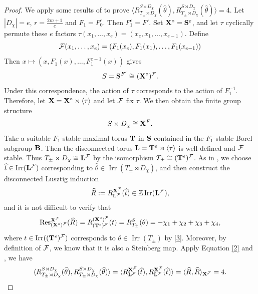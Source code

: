 \documentclass[11pt,a4paper]{article}
\numberwithin{equation}{section}
\theoremstyle{definition}
\theoremstyle{remark}
\newcommand{\Irr}{\operatorname{Irr}}
\begin{document}
\begin{proof}
We apply some results of \cite[Sections 2-3]{DM} to prove  $\langle R_{T_\pm\rtimes D_\chi}^{S\rtimes D_\chi}(\widehat \theta), R_{T_\pm\rtimes D_\chi}^{S\rtimes D_\chi}(\widehat \theta) \rangle=4$.
Let $|D_\chi|=e$, $r=\frac{2m+1}{e}$ and $F_1=F_0^r$.
Then $F_1^e=F'$. Set ${\bf X}^\circ={\bf S}^e$, and let $\tau$ cyclically permute these $e$ factors
$\tau(x_1,\dots,x_e)=(x_e,x_1,\dots,x_{e-1})$.
Define 
\[
{\cal F}(x_1,\dots,x_e)=(F_1(x_e),F_1(x_1),\dots,F_1(x_{e-1}))
\]
Then
$x\mapsto (x,F_1(x),\dots,F_1^{e-1}(x))$
gives 
\begin{equation}\label{3}
S={\bf S}^{F'}\cong ({\bf X}^\circ)^{\cal F}.   
\end{equation}
Under this correspondence, the action of $\tau$ corresponds to the action of $F_1^{-1}$. Therefore, let
${\bf X}={\bf X}^\circ\rtimes\langle\tau\rangle$ and let ${\cal F}$ fix $\tau$. We then obtain the finite group structure 
\[
S\rtimes D_\chi\cong {\bf X}^F.
\]
Take a suitable $F_1$-stable maximal torus ${\bf T}$ in ${\bf S}$ contained in the $F_1$-stable Borel subgroup ${\bf B}$. 
Then the disconnected torus ${\bf L}={\bf T}^e\rtimes \langle \tau\rangle$ is well-defined and $\cal F$-stable.
Thus $T_{\pm}\rtimes D_\chi\cong{\bf L}^{\cal F}$ by the isomorphism $T_{\pm}\cong({\bf T}^e)^{\cal F}$.
As in \cite[Definition 2.4]{DM}, we choose 
$\widehat t\in\Irr({\bf L}^{\cal F})$ corresponding to $\hat{\theta}\in\Irr(T_{\pm}\rtimes D_\chi)$, and then construct the disconnected Lusztig induction
\[
\widehat R:=R_{{\bf L}^{\cal F}}^{{\bf X}^{\cal F}}(\widehat t)\in{\mathbb Z}\Irr({\bf L}^{\cal F}),
\]
and it is not difficult to verify that 
\begin{equation}\label{4}
{\rm Res}^{{\bf X}^{\cal F}}_{({\bf X^\circ})^{\cal F}}(\widehat R)=R_{({\bf T}^e)^{\cal F}}^{({{\bf X}^\circ})^{\cal F}}(t)=
R_{T_\pm}^S(\theta)=-\chi_1+\chi_2+\chi_3+\chi_4, 
\end{equation}
where $t\in\Irr(({\bf T}^e)^{\cal F})$ corresponds to  $\theta\in\Irr(T_\pm)$ by \eqref{3}. Moreover, by definition of ${\cal F}$, we know that it is also a Steinberg map. Apply Equation \eqref{2} and \cite[Proposition 3.2]{DM}, we have 
\begin{equation}\label{5}
\langle R_{T_\pm\rtimes  D_\chi}^{S\rtimes  D_\chi}(\widehat \theta), R_{T_\pm\rtimes  D_\chi}^{S\rtimes  D_\chi}(\widehat \theta) \rangle=\langle R_{{\bf L}^{\cal F}}^{{\bf X}^{\cal F}}(\widehat t), R_{{\bf L}^{\cal F}}^{{\bf X}^{\cal F}}(\widehat t) \rangle=\langle \widehat R, \widehat R \rangle_{{\bf X}^{\cal F}}=4.
\end{equation}


\end{proof}
\end{document}

